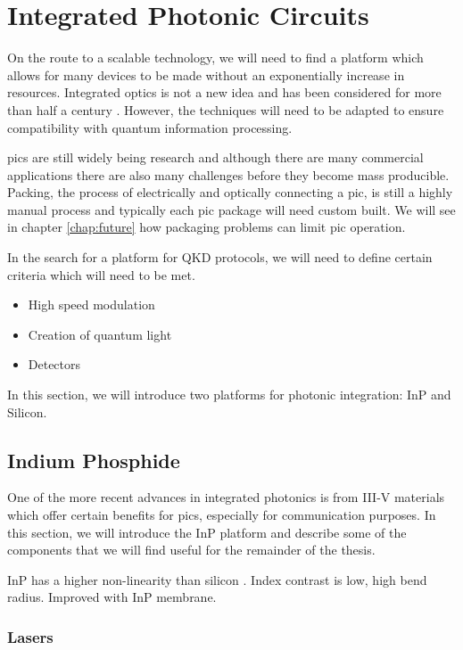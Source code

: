 \section{Integrated Photonic Circuits}

On the route to a scalable technology, we will need to find a platform which allows for many devices to be made without an exponentially increase in resources. Integrated optics is not a new idea and has been considered for more than half a century \cite{miller1969}. However, the techniques will need to be adapted to ensure compatibility with quantum information processing.

\Acp{pic} are still widely being research and although there are many commercial applications there are also many challenges before they become mass producible. Packing, the process of electrically and optically connecting a \ac{pic}, is still a highly manual process and typically each \ac{pic} package will need custom built. We will see in chapter \ref{chap:future} how packaging problems can limit \ac{pic} operation.

In the search for a platform for \ac{QKD} protocols, we will need to define certain criteria which will need to be met.

\begin{itemize}
	\item High speed modulation
	\item Creation of quantum light
	\item Detectors
\end{itemize}

In this section, we will introduce two platforms for photonic integration: \Ac{InP} and Silicon.

\subsection{Indium Phosphide}

One of the more recent advances in integrated photonics is from III-V materials which offer certain benefits for \acp{pic}, especially for communication purposes. In this section, we will introduce the \acl{InP} platform and describe some of the components that we will find useful for the remainder of the thesis.

\Ac{InP} has a higher non-linearity than silicon \cite{Kumar2019}. Index contrast is low, high bend radius. Improved with InP membrane.

\subsubsection*{Lasers}


